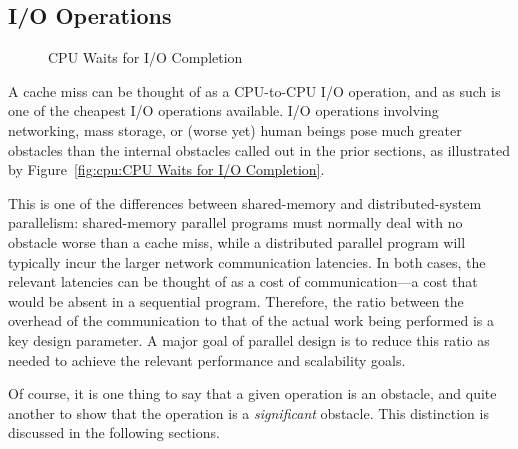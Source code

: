 \subsection{I/O Operations}
\label{sec:cpu:I/O Operations}

\begin{figure}[htb]
\begin{center}
\end{center}
\caption{CPU Waits for I/O Completion}
\end{figure}

A cache miss can be thought of as a CPU-to-CPU I/O operation, and as
such is one of the cheapest I/O operations available.
I/O operations involving networking, mass storage, or (worse yet) human
beings pose much greater obstacles than the internal obstacles called
out in the prior sections,
as illustrated by
Figure~\ref{fig:cpu:CPU Waits for I/O Completion}.

This is one of the differences between shared-memory and distributed-system
parallelism: shared-memory parallel programs must normally deal with no
obstacle worse than a cache miss, while a distributed parallel program
will typically incur the larger network communication latencies.
In both cases, the relevant latencies can be thought of as a cost of
communication---a cost that would be absent in a sequential program.
Therefore, the ratio between the overhead of the communication to
that of the actual work being performed is a key design parameter.
A major goal of parallel design is to reduce this ratio as needed to
achieve the relevant performance and scalability goals.

Of course, it is one thing to say that a given operation is an obstacle,
and quite another to show that the operation is a \emph{significant}
obstacle.
This distinction is discussed in the following sections.
